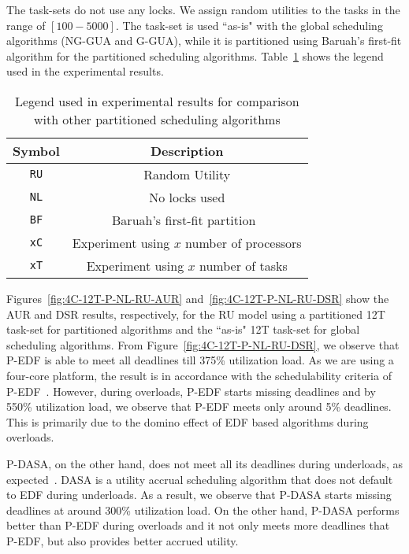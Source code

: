 \documentclass[12pt,dvips]{report}
\begin{document}
The task-sets do not use any locks. We assign random utilities to the tasks in the range of $[100-5000]$. The task-set is used ``as-is" with the global scheduling algorithms (NG-GUA and G-GUA), while it is partitioned using Baruah's first-fit algorithm for the partitioned scheduling algorithms. Table~\ref{tab:part-legend} shows the legend used in the experimental results. 

\begin{table} [htbp]
\caption{Legend used in experimental results for comparison with other partitioned scheduling algorithms}
\label{tab:part-legend}
\begin{center}
\begin{tabular}{c c}
\hline
Symbol & Description \\ \hline
\texttt{RU} & Random Utility\\
\texttt{NL} & No locks used \\
\texttt{BF} & Baruah's first-fit partition~\cite{baruah-part-06} \\
\texttt{xC} & Experiment using $x$ number of processors \\
\texttt{xT} & Experiment using $x$ number of tasks \\
\hline
\end{tabular}
\end{center}
\end{table}

Figures~\ref{fig:4C-12T-P-NL-RU-AUR} and~\ref{fig:4C-12T-P-NL-RU-DSR} show the AUR and DSR results, respectively, for the RU model using a partitioned 12T task-set for partitioned algorithms and the ``as-is" 12T task-set for global scheduling algorithms. From Figure~\ref{fig:4C-12T-P-NL-RU-DSR}, we observe that P-EDF is able to meet all deadlines till 375\% utilization load. As we are using a four-core platform, the result is in accordance with the schedulability criteria of P-EDF~\cite{anderson_pedf}. However, during overloads, P-EDF starts missing deadlines and by 550\% utilization load, we observe that P-EDF meets only around 5\% deadlines. This is primarily due to the domino effect of EDF based algorithms during overloads. 

P-DASA, on the other hand, does not meet all its deadlines during underloads, as expected~\cite{DASA}. DASA is a utility accrual scheduling algorithm that does not default to EDF during underloads. As a result, we observe that P-DASA starts missing deadlines at around 300\% utilization load. On the other hand, P-DASA performs better than P-EDF during overloads and it not only meets more deadlines that P-EDF, but also provides better accrued utility.
\end{document}
